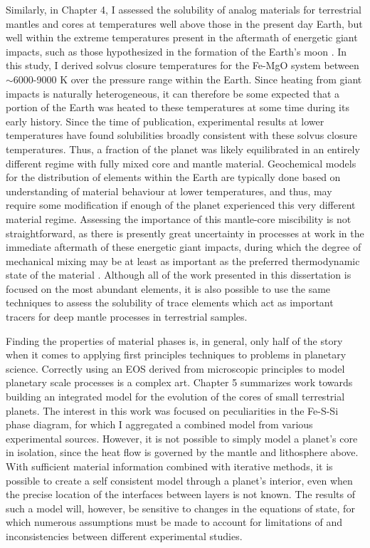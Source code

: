 Similarly, in Chapter 4, I assessed the solubility of analog materials for
terrestrial mantles and cores at temperatures well above those in the present day
Earth, but well within the extreme temperatures present in the aftermath of energetic
giant impacts, such as those hypothesized in the formation of the Earth's moon
\citep{Cuk2012,Canup2012}. In this study, I derived solvus closure temperatures for
the Fe-MgO system between $\sim$6000-9000 K over the pressure range within the Earth.
Since heating from giant impacts is naturally heterogeneous, it can therefore be
some expected that a portion of the Earth was heated to these temperatures at some time during
its early history. Since the time of publication, experimental results at lower
temperatures \citep{Badro2016} have found solubilities broadly consistent with these
solvus closure temperatures. Thus, a fraction of the planet was likely equilibrated
in an entirely different regime with fully mixed core and mantle material.
Geochemical models for the distribution of elements within the Earth are typically
done based on understanding of material behaviour at lower temperatures, and thus, may
require some modification if enough of the planet experienced this very different
material regime.  Assessing the importance of this mantle-core miscibility is not
straightforward, as there is presently great uncertainty in processes at work in the
immediate aftermath of these energetic giant impacts, during which the degree of
mechanical mixing may be at least as important as the preferred thermodynamic state
of the material \citep{Nakajima2014,Deguen2014}. Although all of the work presented
in this dissertation is focused on the most abundant elements, it is also possible to
use the same techniques to assess the solubility of trace elements which act as
important tracers for deep mantle processes in terrestrial samples.

Finding the properties of material phases is, in general, only half of the story when
it comes to applying first principles techniques to problems in planetary science.
Correctly using an EOS derived from microscopic principles to model planetary scale
processes is a complex art. Chapter 5 summarizes work towards building an integrated
model for the evolution of the cores of small terrestrial planets. The interest in
this work was focused on peculiarities in the Fe-S-Si phase diagram, for which I
aggregated a combined model from various experimental sources.  However, it is not
possible to simply model a planet's core in isolation, since the heat flow is
governed by the mantle and lithosphere above. With sufficient material information
combined with iterative methods, it is possible to create a self consistent model
through a planet's interior, even when the precise location of the interfaces between
layers is not known. The results of such a model will, however, be sensitive to
changes in the equations of state, for which numerous assumptions must be made to
account for limitations of and inconsistencies between different experimental
studies.

